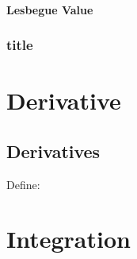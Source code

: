 \documentclass[Total.tex]{subfiles}
\begin{document}
				\subsubsection{Lesbegue Value}
			\subsection{title}
	\chapter{Derivative}
		\section{Derivatives}
			\begin{Def}
				Define:
			\end{Def}
	\chapter{Integration}
\end{document}
